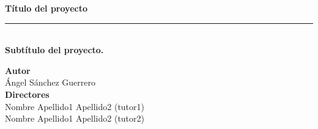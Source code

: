 \begin{titlepage}
 
 
    \setlength{\centeroffset}{-0.5\oddsidemargin}
    \addtolength{\centeroffset}{0.5\evensidemargin}
    \thispagestyle{empty}
    
    \noindent\hspace*{\centeroffset}\begin{minipage}{\textwidth}
    
    \centering
    
    
     \vspace{3.3cm}
    
    
    
    {\Huge\bfseries Título del proyecto\\
    }
    \noindent\rule[-1ex]{\textwidth}{3pt}\\[3.5ex]
    {\large\bfseries Subtítulo del proyecto.\\[4cm]}
    \end{minipage}
    
    \vspace{2.5cm}
    \noindent\hspace*{\centeroffset}\begin{minipage}{\textwidth}
    \centering
    
    \textbf{Autor}\\ {Ángel Sánchez Guerrero}\\[2.5ex]
    \textbf{Directores}\\
    {Nombre Apellido1 Apellido2 (tutor1)\\
    Nombre Apellido1 Apellido2 (tutor2)}\\[2cm]
    \end{minipage}
    
     
    \end{titlepage}
    
    
    